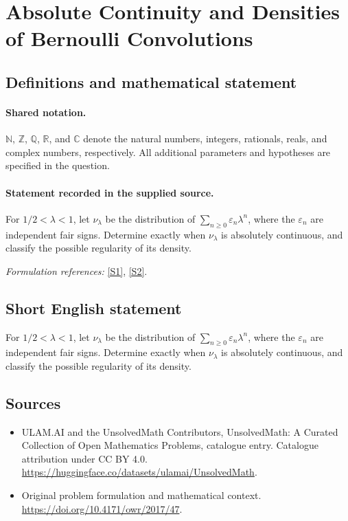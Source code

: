 \documentclass[11pt]{article}
\newcommand{\sref}[2]{\hyperlink{source:#1:#2}{[S#2]}}
\begin{document}
\section{Absolute Continuity and Densities of Bernoulli Convolutions}\label{statement}

\subsection{Definitions and mathematical statement}

\paragraph{Shared notation.}$\mathbb N$, $\mathbb Z$, $\mathbb Q$, $\mathbb R$, and $\mathbb C$ denote the natural numbers, integers, rationals, reals, and complex numbers, respectively. All additional parameters and hypotheses are specified in the question.


\paragraph{Statement recorded in the supplied source.}
For $1/2<\lambda<1$, let $\nu_\lambda$ be the distribution of $\sum_{n\geq0}\varepsilon_n\lambda^n$, where the $\varepsilon_n$ are independent fair signs. Determine exactly when $\nu_\lambda$ is absolutely continuous, and classify the possible regularity of its density.
\par\smallskip\textit{Formulation references:} \sref{statement}{1}, \sref{statement}{2}.
\subsection{Short English statement}
For $1/2<\lambda<1$, let $\nu_\lambda$ be the distribution of $\sum_{n\geq0}\varepsilon_n\lambda^n$, where the $\varepsilon_n$ are independent fair signs. Determine exactly when $\nu_\lambda$ is absolutely continuous, and classify the possible regularity of its density.
\subsection{Sources}
\begin{itemize}
\item[\hypertarget{source:statement:1}{S1}] ULAM.AI and the UnsolvedMath Contributors, UnsolvedMath: A Curated Collection of Open Mathematics Problems, catalogue entry. Catalogue attribution under CC BY 4.0.
\url{https://huggingface.co/datasets/ulamai/UnsolvedMath}.
\item[\hypertarget{source:statement:2}{S2}] Original problem formulation and mathematical context.
\url{https://doi.org/10.4171/owr/2017/47}.
\end{itemize}
\label{end:statement}
\end{document}
